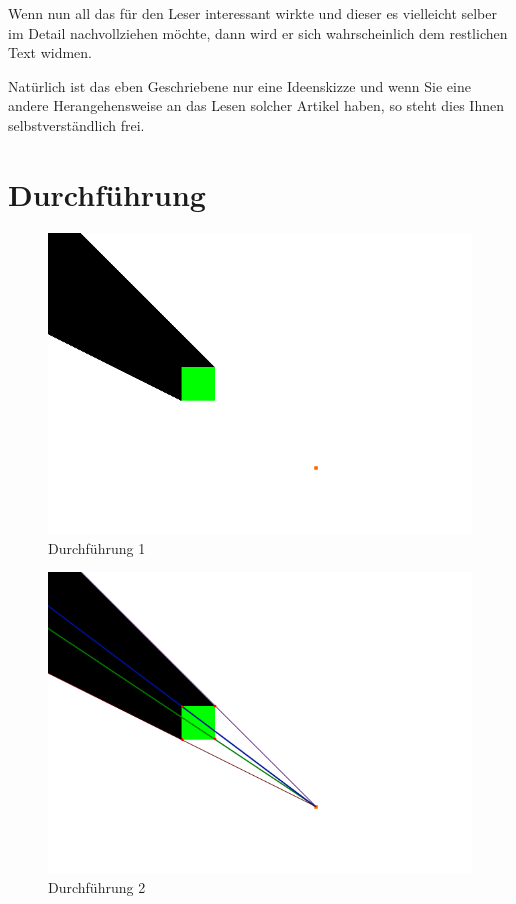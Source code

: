 \documentclass[10pt,twocolumn]{scrartcl}
\begin{document}
Wenn nun all das für den Leser interessant wirkte und dieser es vielleicht
selber im Detail nachvollziehen möchte, dann wird er sich wahrscheinlich
dem restlichen Text widmen.

Natürlich ist das eben Geschriebene nur eine Ideenskizze und wenn
Sie eine andere Herangehensweise an das Lesen solcher Artikel haben,
so steht dies Ihnen selbstverständlich frei.

\section{Durchführung}

\begin{figure}[H]
	\centering
	\includegraphics[width=\columnwidth]{images/durchfuehrung.png}
	\caption{Durchführung 1}
	\label{durch1}
\end{figure}

\begin{figure}[H]
	\centering
	\includegraphics[width=\columnwidth]{images/durchfuehrung_1.png}
	\caption{Durchführung 2}
	\label{durch2}
\end{figure}
\end{document}
